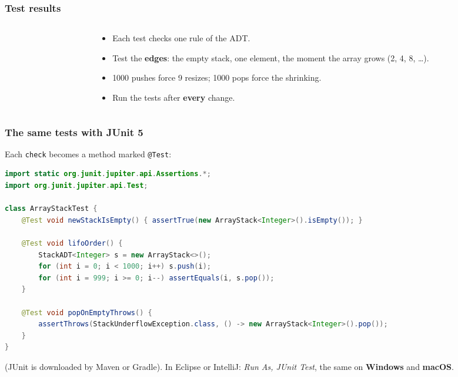 \documentclass[aspectratio=169,10pt,compress]{beamer}
\newcommand{\win}{\textbf{Windows}}
\newcommand{\mac}{\textbf{macOS}}
\begin{document}
\begin{frame}[t,fragile] \frametitle{Test results}
  \begin{columns}[T]
    \begin{column}{0.48\textwidth}
    \end{column}
    \begin{column}{0.48\textwidth}
      \begin{itemize}\small
        \item Each test checks one rule of the ADT.
        \item Test the \textbf{edges}: the empty stack, one element, the moment the array grows (2, 4, 8, \dots).
        \item 1000 pushes force 9 resizes; 1000 pops force the shrinking.
        \item Run the tests after \textbf{every} change.
      \end{itemize}
    \end{column}
  \end{columns}
\end{frame}




\begin{frame}[t,fragile] \frametitle{The same tests with JUnit 5}
  \small Each \texttt{check} becomes a method marked \texttt{@Test}:


\begin{lstlisting}[style=codesnippet, language=Java, basicstyle=\ttfamily\scriptsize]
import static org.junit.jupiter.api.Assertions.*;
import org.junit.jupiter.api.Test;

class ArrayStackTest {
    @Test void newStackIsEmpty() { assertTrue(new ArrayStack<Integer>().isEmpty()); }

    @Test void lifoOrder() {
        StackADT<Integer> s = new ArrayStack<>();
        for (int i = 0; i < 1000; i++) s.push(i);
        for (int i = 999; i >= 0; i--) assertEquals(i, s.pop());
    }

    @Test void popOnEmptyThrows() {
        assertThrows(StackUnderflowException.class, () -> new ArrayStack<Integer>().pop());
    }
}
\end{lstlisting}


  \small {} (JUnit is downloaded by Maven or Gradle). In Eclipse or IntelliJ: \emph{Run As, JUnit Test},
  the same on \win{} and \mac.
\end{frame}
\end{document}
